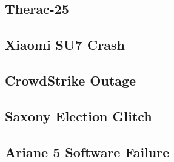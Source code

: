 \subsection{Therac-25} %
\begin{frame}{\insertsubsection}
	\slideTherac
\end{frame}

\subsection{Xiaomi SU7 Crash} %
\begin{frame}{\insertsubsection}
	\slideXiaomiCrash
\end{frame}


\subsection{CrowdStrike Outage} %
\begin{frame}{\insertsubsection}
	\slideCrowdStrike
\end{frame}

\subsection{Saxony Election Glitch} %
\begin{frame}{\insertsubsection}
	\slideSaxonyElection
\end{frame}

\subsection{Ariane 5 Software Failure} %
\begin{frame}{\insertsubsection}
	\slideArianeFailure
\end{frame}

